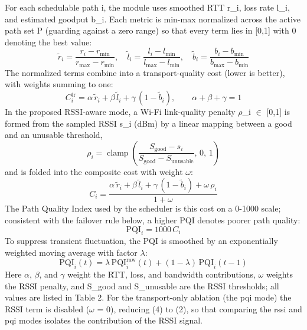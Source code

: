 \documentclass[preprint,11pt]{elsarticle}
\begin{document}
For each schedulable path i, the module uses smoothed RTT r\_i, loss rate l\_i, and estimated goodput b\_i. Each metric is min-max normalized across the active path set P (guarding against a zero range) so that every term lies in [0,1] with 0 denoting the best value:
\begin{equation}\label{eq:1}
\tilde{r}_i = \frac{r_i - r_{\min}}{r_{\max}-r_{\min}},\quad \tilde{l}_i = \frac{l_i - l_{\min}}{l_{\max}-l_{\min}},\quad \tilde{b}_i = \frac{b_i - b_{\min}}{b_{\max}-b_{\min}}
\end{equation}
The normalized terms combine into a transport-quality cost (lower is better), with weights summing to one:
\begin{equation}\label{eq:2}
C_i^{\mathrm{tr}} = \alpha\,\tilde{r}_i + \beta\,\tilde{l}_i + \gamma\,(1-\tilde{b}_i),\qquad \alpha+\beta+\gamma=1
\end{equation}
In the proposed RSSI-aware mode, a Wi-Fi link-quality penalty $\rho$\_i $\in$ [0,1] is formed from the sampled RSSI s\_i (dBm) by a linear mapping between a good and an unusable threshold,
\begin{equation}\label{eq:3}
\rho_i = \operatorname{clamp}\!\left(\frac{S_{\mathrm{good}}-s_i}{S_{\mathrm{good}}-S_{\mathrm{unusable}}},\,0,\,1\right)
\end{equation}
and is folded into the composite cost with weight $\omega$:
\begin{equation}\label{eq:4}
C_i = \frac{\alpha\,\tilde{r}_i + \beta\,\tilde{l}_i + \gamma\,(1-\tilde{b}_i) + \omega\,\rho_i}{1+\omega}
\end{equation}
The Path Quality Index used by the scheduler is this cost on a 0-1000 scale; consistent with the failover rule below, a higher PQI denotes poorer path quality:
\begin{equation}\label{eq:5}
\mathrm{PQI}_i = 1000\,C_i
\end{equation}
To suppress transient fluctuation, the PQI is smoothed by an exponentially weighted moving average with factor $\lambda$:
\begin{equation}\label{eq:6}
\mathrm{PQI}_i(t) = \lambda\,\mathrm{PQI}_i^{\mathrm{raw}}(t) + (1-\lambda)\,\mathrm{PQI}_i(t-1)
\end{equation}
Here $\alpha$, $\beta$, and $\gamma$ weight the RTT, loss, and bandwidth contributions, $\omega$ weights the RSSI penalty, and S\_good and S\_unusable are the RSSI thresholds; all values are listed in Table 2. For the transport-only ablation (the pqi mode) the RSSI term is disabled ($\omega$ = 0), reducing (4) to (2), so that comparing the rssi and pqi modes isolates the contribution of the RSSI signal.
\end{document}
